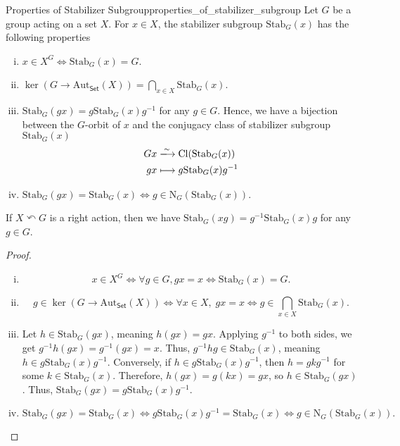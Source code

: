\begin{proposition}{Properties of Stabilizer Subgroup}{properties_of_stabilizer_subgroup}
    Let $G$ be a group acting on a set $X$. For $x\in X$, the stabilizer subgroup $\mathrm{Stab}_G(x)$ has the following properties
    \begin{enumerate}[(i)]
        \item $x\in X^G\iff \mathrm{Stab}_G(x)=G$.
        \item $\ker \left(G\to \mathrm{Aut}_{\mathsf{Set}}(X)\right)=\bigcap\limits_{x\in X}\mathrm{Stab}_G(x)$.
        \item $\mathrm{Stab}_G(gx)=g\mathrm{Stab}_G(x)g^{-1}$ for any $g\in G$. Hence, we have a bijection between the $G$-orbit of $x$ and the conjugacy class of stabilizer subgroup $\mathrm{Stab}_G(x)$
        \begin{align*}
            Gx&\xlongrightarrow{\sim} \mathrm{Cl}(\mathrm{Stab}_G(x))\\
            gx&\longmapsto  g\mathrm{Stab}_G(x)g^{-1}
        \end{align*}
        \item $\mathrm{Stab}_G(gx)=\mathrm{Stab}_G(x)\iff g\in \mathrm{N}_G(\mathrm{Stab}_G(x))$.
    \end{enumerate}
    If $X \curvearrowleft G$ is a right action, then we have $\mathrm{Stab}_G(xg)=g^{-1}\mathrm{Stab}_G(x)g$ for any $g\in G$.
\end{proposition}
\begin{proof}
    \begin{enumerate}[(i)]
        \item 
        $$
        x \in X^G \iff \forall g \in G, gx = x \iff \mathrm{Stab}_G(x) = G.
        $$
        \item 
        $$
        g \in \ker \left(G \to \mathrm{Aut}_{\mathsf{Set}}(X) \right) \iff  \forall x \in X ,\; gx = x \iff g \in \bigcap_{x \in X} \mathrm{Stab}_G(x).
        $$    
        \item  Let $h \in \mathrm{Stab}_G(gx)$, meaning $h(gx) = gx$.
        Applying $g^{-1}$ to both sides, we get $g^{-1}h(gx) = g^{-1}(gx)=x$. Thus, $g^{-1}hg \in \mathrm{Stab}_G(x)$, meaning $h \in g \mathrm{Stab}_G(x) g^{-1}$.
        Conversely, if $h \in g \mathrm{Stab}_G(x) g^{-1}$, then $h = g k g^{-1}$ for some $k \in \mathrm{Stab}_G(x)$. Therefore, $h(gx) = g(kx) = gx$, so $h \in \mathrm{Stab}_G(gx)$.
        Thus, $\mathrm{Stab}_G(gx) = g \mathrm{Stab}_G(x) g^{-1}$.
        \item  
        \[
            \mathrm{Stab}_G(gx)=\mathrm{Stab}_G(x)\iff g\mathrm{Stab}_G(x)g^{-1}= \mathrm{Stab}_G(x) \iff g\in \mathrm{N}_G(\mathrm{Stab}_G(x)).
        \]
    \end{enumerate}
\end{proof}

